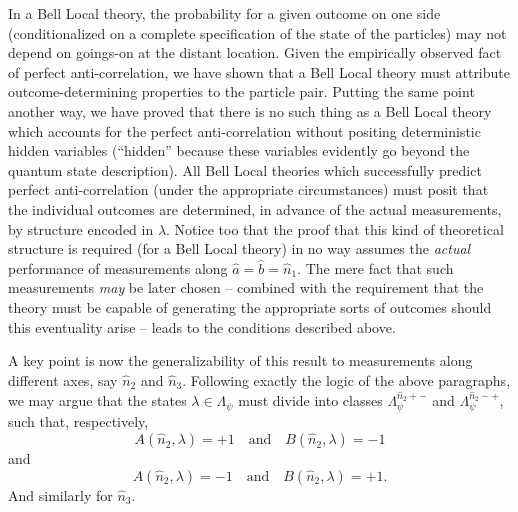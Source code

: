 \documentclass[aps,prc,onecolumn,12pt]{revtex4-2}
\begin{document}
In a Bell Local theory, the probability for a given outcome on one
side (conditionalized on a complete specification of the state of the
particles) may not depend on goings-on at the distant location.  Given
the empirically observed fact of perfect anti-correlation, we have
shown that a Bell Local theory must attribute
outcome-determining properties to the particle pair.
Putting the same point another way, we have proved that there is no
such thing as a Bell Local theory which accounts for the perfect
anti-correlation without positing deterministic hidden variables
(``hidden'' because these variables evidently go beyond the quantum
state description).  All Bell Local theories which successfully
predict perfect anti-correlation (under the appropriate circumstances)
must posit that the individual
outcomes are determined, in advance of the actual measurements,
by structure encoded in $\lambda$.  Notice too that the proof that
this kind of theoretical structure is required (for a Bell Local
theory) in no way assumes the \emph{actual} performance of
measurements along $\hat{a} = \hat{b} = \hat{n}_1$.  The mere fact
that such measurements \emph{may} be later chosen  -- combined with
the requirement that the theory must be capable of generating the
appropriate sorts of outcomes should this eventuality arise -- leads
to the conditions described above.

A key point is now the generalizability of this result to measurements
along different axes, say $\hat{n}_2$ and $\hat{n}_3$.  Following
exactly the logic of the above paragraphs, we may argue that
the states $\lambda \in \Lambda_\psi $ must divide into classes
$ \Lambda^{\hat{n}_2 + - }_\psi  $ and
$ \Lambda^{\hat{n}_2 - + }_\psi  $, such that, respectively,
\begin{equation}
A(\hat{n}_2,\lambda)=+1 \quad {\mathrm{and}} \quad B(\hat{n}_2,\lambda)=-1
\end{equation}
and
\begin{equation}
A(\hat{n}_2,\lambda)=-1 \quad {\mathrm{and}} \quad B(\hat{n}_2,\lambda)=+1.
\end{equation}
And similarly for $\hat{n}_3$.
\end{document}
